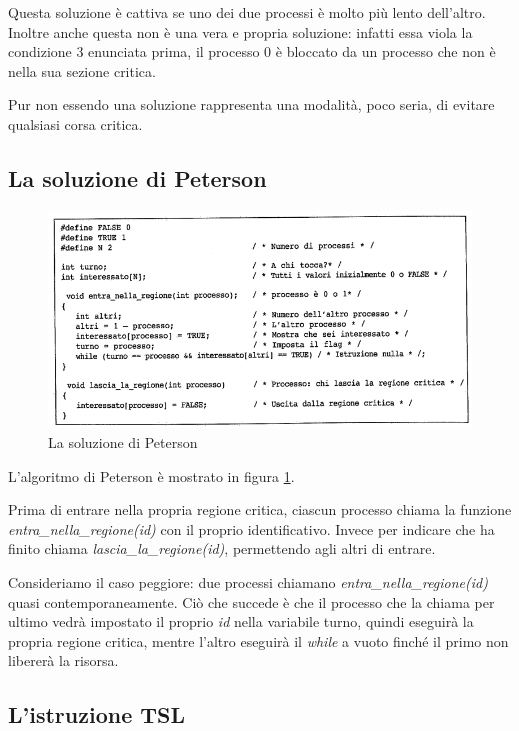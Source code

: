 Questa soluzione è cattiva se uno dei due processi è molto più lento dell'altro. Inoltre anche questa non è una vera e propria soluzione: infatti essa viola la condizione 3 enunciata prima, il processo 0 è bloccato da un processo che non è nella sua sezione critica.

Pur non essendo una soluzione rappresenta una modalità, poco seria, di evitare qualsiasi corsa critica.

\subsection{La soluzione di Peterson}

\begin{figure}[H]
    \centering
    \includegraphics[width=1\linewidth]{assets/peterson6.png}
    \caption{La soluzione di Peterson}
    \label{peterson}
\end{figure}

L'algoritmo di Peterson è mostrato in figura \ref{peterson}.

Prima di entrare nella propria regione critica, ciascun processo chiama la funzione \textit{entra\_nella\_regione(id)} con il proprio identificativo. Invece per indicare che ha finito chiama \textit{lascia\_la\_regione(id)}, permettendo agli altri di entrare.

Consideriamo il caso peggiore: due processi chiamano \textit{entra\_nella\_regione(id)} quasi contemporaneamente. Ciò che succede è che il processo che la chiama per ultimo vedrà impostato il proprio \textit{id} nella variabile turno, quindi eseguirà la propria regione critica, mentre l'altro eseguirà il \textit{while} a vuoto finché il primo non libererà la risorsa.

\subsection{L'istruzione TSL}

